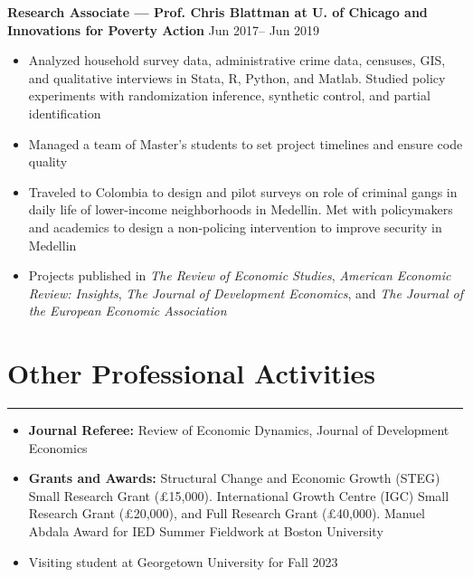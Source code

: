 \documentclass[10pt]{article}
\newenvironment{customitemize}
{ \begin{itemize}[leftmargin=\parindent, topsep = 0.2pt, itemsep = -3pt] }
{\end{itemize} }
\begin{document}

\noindent \textbf{Research Associate --- Prof. Chris Blattman at U. of Chicago and Innovations for Poverty Action}  \hfill Jun 2017-- Jun 2019 
\begin{customitemize}
	\item Analyzed household survey data, administrative crime data, censuses, GIS, and qualitative interviews in Stata, R, Python, and Matlab. Studied policy experiments with randomization inference, synthetic control, and partial identification
	\item Managed a team of Master's students to set project timelines and ensure code quality 
	\item Traveled to Colombia to design and pilot surveys on role of criminal gangs in daily life of lower-income neighborhoods in Medellin. Met with policymakers and academics to design a non-policing intervention to improve security in Medellin
	\item Projects published in \textit{The Review of Economic Studies}, \textit{American Economic Review: Insights}, \textit{The Journal of Development Economics}, and \textit{The Journal of the European Economic Association}
\end{customitemize}

\section*{Other Professional Activities}
\noindent \rule{\textwidth}{1pt} 
\begin{customitemize}
	\item \textbf{Journal Referee:} Review of Economic Dynamics, Journal of Development Economics
	\item \textbf{Grants and Awards:} Structural Change and Economic Growth (STEG) Small Research Grant (\pounds15,000). International Growth Centre (IGC) Small Research Grant (\pounds20,000), and Full Research Grant (\pounds40,000). Manuel Abdala Award for IED Summer Fieldwork at Boston University
	\item Visiting student at Georgetown University for Fall 2023
\end{customitemize}
\end{document}
